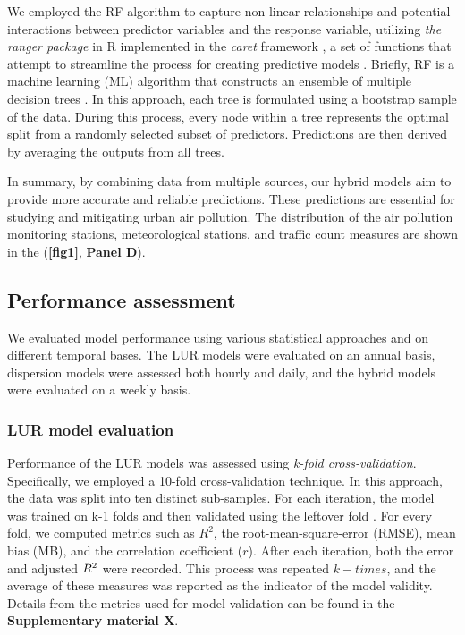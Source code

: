 \documentclass{article}
\begin{document}
We employed the RF algorithm to capture non-linear relationships and potential interactions between predictor variables and the response variable, utilizing \textit{the ranger package} in R implemented in the \textit{caret} framework \cite{wright2019}, a set of functions that attempt to streamline the process for creating predictive models \cite{caret2008}. Briefly, RF is a machine learning (ML) algorithm that constructs an ensemble of multiple decision trees \cite{breiman2001}. In this approach, each tree is formulated using a bootstrap sample of the data. During this process, every node within a tree represents the optimal split from a randomly selected subset of predictors. Predictions are then derived by averaging the outputs from all trees.

In summary, by combining data from multiple sources, our hybrid models aim to provide more accurate and reliable predictions. These predictions are essential for studying and mitigating urban air pollution. The distribution of the air pollution monitoring stations, meteorological stations, and traffic count measures are shown in the (\textbf{\cref{fig1}}, \textbf{Panel D}). 

\subsection{Performance assessment}

We evaluated model performance using various statistical approaches and on different temporal bases. The LUR models were evaluated on an annual basis, dispersion models were assessed both hourly and daily, and the hybrid models were evaluated on a weekly basis.

\subsubsection{LUR model evaluation}
Performance of the LUR models was assessed using \textit{k-fold cross-validation}. Specifically, we employed a 10-fold cross-validation technique. In this approach, the data was split into ten distinct sub-samples. For each iteration, the model was trained on k-1 folds and then validated using the leftover fold \cite{ziegel2003}. For every fold, we computed metrics such as \(R^2\), the root-mean-square-error (RMSE), mean bias (MB), and the correlation coefficient (\(r\)). After each iteration, both the error and adjusted \(R\textsuperscript{2}\) were recorded. This process was repeated \(k-times\), and the average of these measures was reported as the indicator of the model validity. 
\vspace{0.5cm} Details from the metrics used for model validation can be found in the \textbf{Supplementary material X}.
\end{document}
